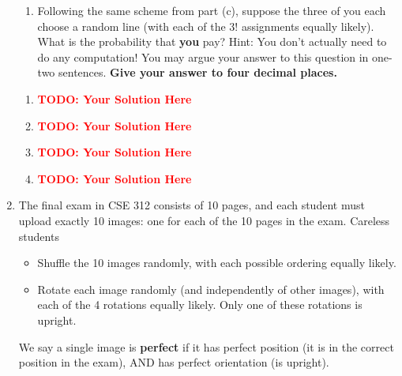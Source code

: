 \documentclass[12pt]{article}
\def\todo#1{\textcolor{red}{\textbf{#1}}}
\renewcommand{\|}{\mid}
\begin{document}
\begin{enumerate}
\begin{enumerate}
    \item Following the same scheme from part (c), suppose the three of you each choose a random line (with each of the $3!$ assignments equally likely). What is the probability that \textbf{you} pay? Hint: You don't actually need to do any computation! You may argue your answer to this question in one-two sentences. \textbf{Give your answer to four decimal places.}
\end{enumerate}
  \begin{tcolorbox}
\begin{enumerate}
\item \todo{TODO: Your Solution Here}
\item \todo{TODO: Your Solution Here}
\item \todo{TODO: Your Solution Here}
\item \todo{TODO: Your Solution Here}
\end{enumerate}
\end{tcolorbox}

\pagebreak

\item The final exam in CSE 312 consists of 10 pages, and each student must upload exactly 10 images: one for each of the 10 pages in the exam. Careless students
\begin{itemize}
    \item Shuffle the 10 images randomly, with each possible ordering equally likely.
    \item Rotate each image randomly (and independently of other images), with each of the 4 rotations equally likely. Only one of these rotations is upright.
\end{itemize}
We say a single image is \textbf{perfect} if it has perfect position (it is in the correct position in the exam), AND has perfect orientation (is upright). 


\end{enumerate}
\end{document}
